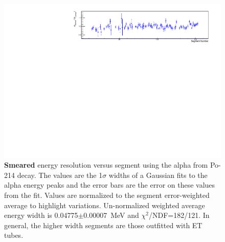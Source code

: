 \begin{figure}[!h]
\centering
\includegraphics[width=1.05\textwidth]{figures/PubBiPo214EsmearresvsCell.pdf}
\caption{\label{fig:EsmearresvsCell214}{\bf Smeared} energy resolution versus segment using the alpha from Po-214 decay. The values are the 1$\sigma$ widths of a Gaussian fits to the alpha energy peaks and the error bars are the error on these values from the fit. Values are normalized to the segment error-weighted average to highlight variations. Un-normalized weighted average energy width is 0.04775$\pm$0.00007~MeV and $\chi^2$/NDF=182/121.  In general, the higher width segments are those outfitted with ET tubes.}
\end{figure}
\clearpage
\newpage
